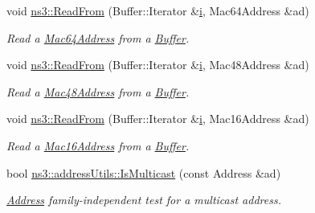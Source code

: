 \begin{DoxyCompactItemize}
void \hyperlink{namespacens3_a9cd4c5f4a363c1424798b8c91d29cac7}{ns3\+::\+Read\+From} (Buffer\+::\+Iterator \&\hyperlink{lte__uplink__power__control_8m_a6f6ccfcf58b31cb6412107d9d5281426}{i}, Mac64\+Address \&ad)
\begin{DoxyCompactList}\small\item\em Read a \hyperlink{classns3_1_1Mac64Address}{Mac64\+Address} from a \hyperlink{classns3_1_1Buffer}{Buffer}. \end{DoxyCompactList}\item 
void \hyperlink{namespacens3_a90e4f6909137ffaf4c5a82ddbe334702}{ns3\+::\+Read\+From} (Buffer\+::\+Iterator \&\hyperlink{lte__uplink__power__control_8m_a6f6ccfcf58b31cb6412107d9d5281426}{i}, Mac48\+Address \&ad)
\begin{DoxyCompactList}\small\item\em Read a \hyperlink{classns3_1_1Mac48Address}{Mac48\+Address} from a \hyperlink{classns3_1_1Buffer}{Buffer}. \end{DoxyCompactList}\item 
void \hyperlink{namespacens3_aa56dc030fae9d8f59961c6f1c3039b11}{ns3\+::\+Read\+From} (Buffer\+::\+Iterator \&\hyperlink{lte__uplink__power__control_8m_a6f6ccfcf58b31cb6412107d9d5281426}{i}, Mac16\+Address \&ad)
\begin{DoxyCompactList}\small\item\em Read a \hyperlink{classns3_1_1Mac16Address}{Mac16\+Address} from a \hyperlink{classns3_1_1Buffer}{Buffer}. \end{DoxyCompactList}\item 
bool \hyperlink{namespacens3_1_1addressUtils_a2806342189d7bd73179d40bbf81bdb41}{ns3\+::address\+Utils\+::\+Is\+Multicast} (const Address \&ad)
\begin{DoxyCompactList}\small\item\em \hyperlink{classns3_1_1Address}{Address} family-\/independent test for a multicast address. \end{DoxyCompactList}\end{DoxyCompactItemize}
